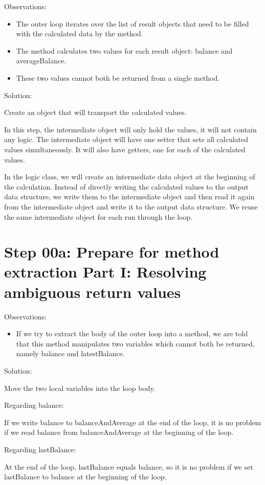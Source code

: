 \documentclass[a4paper,fleqn,titlepage,11pt]{article}
\begin{document}
Observations:
\begin{itemize}
\item The outer loop iterates over the list of result objects that need to be filled with the calculated data by the method.
\item The method calculates two values for each result object: balance and averageBalance. 
\item These two values cannot both be returned from a single method.
\end{itemize}

Solution:

Create an object that will transport the calculated values. 

In this step, the intermediate object will only hold the values, it will not contain any logic. The intermediate object will have one setter that sets all calculated values simultaneously. It will also have getters, one for each of the calculated values.

In the logic class, we will create an intermediate data object at the beginning of the calculation. Instead of directly writing the calculated values to the output data structure, we write them to the intermediate object and then read it again from the intermediate object and write it to the output data structure. We reuse the same intermediate object for each run through the loop.

\section{Step 00a: Prepare for method extraction Part I: Resolving ambiguous return values}

Observations:
\begin{itemize}
\item If we try to extract the body of the outer loop into a method, we are told that this method manipulates two variables which cannot both be returned, namely balance and latestBalance.
\end{itemize}

Solution:

Move the two local variables into the loop body.

Regarding balance:

If we write balance to balanceAndAverage at the end of the loop, it is no problem if we read balance from balanceAndAverage at the beginning of the loop.

Regarding lastBalance:

At the end of the loop, lastBalance equals balance, so it is no problem if we set lastBalance to balance at the beginning of the loop.
\end{document}
